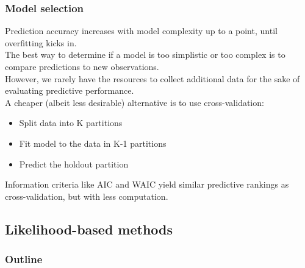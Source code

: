 \documentclass[color=usenames,dvipsnames]{beamer}\usepackage[]{graphicx}\usepackage[]{color}
\begin{document}
\begin{frame}
  \frametitle{Model selection}
  Prediction accuracy increases with model complexity up to a point,
  until overfitting kicks in. \\
  \pause
  \vfill
  The best way to determine if a model is too simplistic or too
  complex is to compare predictions to new observations. \\
  \pause
  \vfill
  However, we rarely have the resources to
  collect additional data for the sake of evaluating predictive
  performance. \\ 
  \pause
  \vfill
  A cheaper (albeit less desirable) alternative is to use
  cross-validation: 
  \begin{itemize}
    \item Split data into K partitions
    \item Fit model to the data in K-1 partitions
    \item Predict the holdout partition
  \end{itemize}
  \pause
  \vfill
  Information criteria like AIC and WAIC yield similar predictive
  rankings as cross-validation, but with less computation.    
\end{frame}




\subsection{Likelihood-based methods}



\begin{frame}
  \frametitle{Outline}
  \Large
\end{frame}
\end{document}
